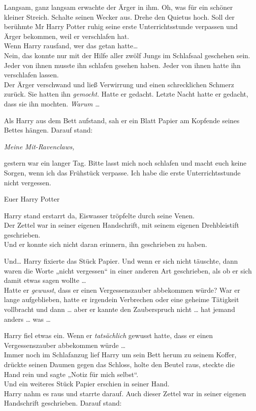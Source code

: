 {Langsam, ganz langsam erwachte der Ärger in ihm. Oh, was für ein schöner kleiner Streich. Schalte seinen Wecker aus. Drehe den Quietus hoch. Soll der berühmte Mr Harry Potter ruhig seine erste Unterrichtsstunde verpassen und Ärger bekommen, weil er verschlafen hat.\\ Wenn Harry rausfand, wer das getan hatte…\\ Nein, das konnte nur mit der Hilfe aller zwölf Jungs im Schlafsaal geschehen sein. Jeder von ihnen musste ihn schlafen gesehen haben. Jeder von ihnen hatte ihn verschlafen lassen.\\ Der Ärger verschwand und ließ Verwirrung und einen schrecklichen Schmerz zurück. Sie hatten ihn \emph{gemocht.} Hatte er gedacht. Letzte Nacht hatte er gedacht, dass sie ihn mochten. \emph{Warum …}

Als Harry aus dem Bett aufstand, sah er ein Blatt Papier am Kopfende seines Bettes hängen. Darauf stand:

\emph{Meine Mit-Ravenclaws,}

gestern war ein langer Tag. Bitte lasst mich noch schlafen und macht euch keine Sorgen, wenn ich das Frühstück verpasse. Ich habe die erste Unterrichtsstunde nicht vergessen.

Euer Harry Potter

Harry stand erstarrt da, Eiswasser tröpfelte durch seine Venen.\\ Der Zettel war in seiner eigenen Handschrift, mit seinem eigenen Drehbleistift geschrieben.\\ Und er konnte sich nicht daran erinnern, ihn geschrieben zu haben.

Und… Harry fixierte das Stück Papier. Und wenn er sich nicht täuschte, dann waren die Worte „nicht vergessen“ in einer anderen Art geschrieben, als ob er sich damit etwas sagen wollte …\\ Hatte er \emph{gewusst}, dass er einen Vergessenszauber abbekommen würde? War er lange aufgeblieben, hatte er irgendein Verbrechen oder eine geheime Tätigkeit vollbracht und dann … aber er kannte den Zauberspruch nicht … hat jemand anders … was …

Harry fiel etwas ein. Wenn er \emph{tatsächlich} gewusst hatte, dass er einen Vergessenszauber abbekommen würde …\\ Immer noch im Schlafanzug lief Harry um sein Bett herum zu seinem Koffer, drückte seinen Daumen gegen das Schloss, holte den Beutel raus, steckte die Hand rein und sagte „Notiz für mich selbst“.\\ Und ein weiteres Stück Papier erschien in seiner Hand.\\ Harry nahm es raus und starrte darauf. Auch dieser Zettel war in seiner eigenen Handschrift geschrieben. Darauf stand:

}
